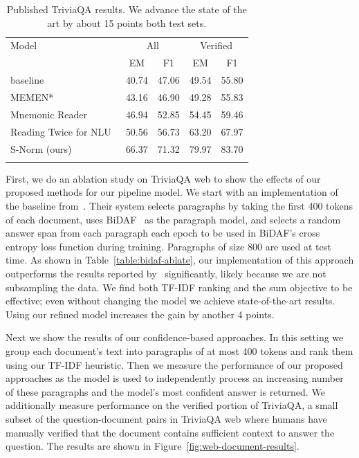 \documentclass[11pt,a4paper]{article}
\begin{document}
\begin{table}
\setlength\doublerulesep{.8pt}
\center
\begin{tabular}{l | c | c | c | c }
\hhline{=====}
Model & \multicolumn{2}{c}{All} & \multicolumn{2}{c}{Verified} \\ 
 & EM & F1 & EM & F1 \\ \hline
 baseline~\cite{triviaqa} & 40.74 & 47.06 & 49.54 & 55.80 \\
MEMEN*~\cite{pan2017memen} & 43.16 & 46.90 & 49.28 & 55.83 \\
Mnemonic Reader~\cite{hu2017mnemonic} & 46.94 & 52.85 & 54.45 & 59.46 \\
Reading Twice for NLU~\cite{weissenborn2017reading} & 50.56 & 56.73 & 63.20 & 67.97 \\ \hline
S-Norm (ours) & 66.37 & 71.32 & 79.97 & 83.70 \\
\hhline{=====}
 \multicolumn{5}{l}{\footnotesize{*Results on the dev set}} \\

\end{tabular}
\caption{Published TriviaQA results. We advance the state of the art by about 15 points both test sets. }
\label{table:triviaqa-leader-board}
\end{table}

First, we do an ablation study on TriviaQA web to show the effects of our proposed methods for our pipeline model. We start with an implementation of the baseline from~\cite{triviaqa}. Their system selects paragraphs by taking the first 400 tokens of each document, uses BiDAF~\cite{bidaf} as the paragraph model, and selects a random answer span from each paragraph each epoch to be used in BiDAF's cross entropy loss function during training. Paragraphs of size 800 are used at test time. As shown in Table~\ref{table:bidaf-ablate}, our implementation of this approach outperforms the results reported by~\citet{triviaqa} significantly, likely because we are not subsampling the data. We find both TF-IDF ranking and the sum objective to be effective; even without changing the model we achieve state-of-the-art results. Using our refined model increases the gain by another 4 points.

Next we show the results of our confidence-based approaches. In this setting we group each document's text into paragraphs of at most 400 tokens and rank them using our TF-IDF heuristic. Then we measure the performance of our proposed approaches as the model is used to independently process an increasing number of these paragraphs and the model's most confident answer is returned. We additionally measure performance on the verified portion of TriviaQA, a small subset of the question-document pairs in TriviaQA web where humans have manually verified that the document contains sufficient context to answer the question. The results are shown in Figure~\ref{fig:web-document-results}. 
\end{document}
